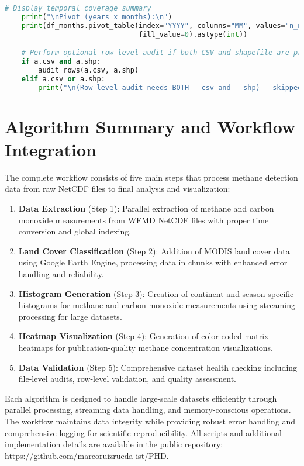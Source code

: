 \begin{lstlisting}[language=Python, caption=Dataset Health Check Algorithm, label=alg:step05_health_check, breaklines=true]
    # Display temporal coverage summary
    print("\nPivot (years x months):\n")
    print(df_months.pivot_table(index="YYYY", columns="MM", values="n_nc",
                                fill_value=0).astype(int))

    # Perform optional row-level audit if both CSV and shapefile are provided
    if a.csv and a.shp:
        audit_rows(a.csv, a.shp)
    elif a.csv or a.shp:
        print("\n(Row-level audit needs BOTH --csv and --shp) - skipped")
\end{lstlisting}

\section{Algorithm Summary and Workflow Integration}
\label{sec:appendixB_summary}

The complete workflow consists of five main steps that process methane detection data from raw NetCDF files to final analysis and visualization:

\begin{enumerate}
	\item \textbf{Data Extraction} (Step 1): Parallel extraction of methane and carbon monoxide measurements from WFMD NetCDF files with proper time conversion and global indexing.

	\item \textbf{Land Cover Classification} (Step 2): Addition of MODIS land cover data using Google Earth Engine, processing data in chunks with enhanced error handling and reliability.

	\item \textbf{Histogram Generation} (Step 3): Creation of continent and season-specific histograms for methane and carbon monoxide measurements using streaming processing for large datasets.

	\item \textbf{Heatmap Visualization} (Step 4): Generation of color-coded matrix heatmaps for publication-quality methane concentration visualizations.

	\item \textbf{Data Validation} (Step 5): Comprehensive dataset health checking including file-level audits, row-level validation, and quality assessment.
\end{enumerate}

Each algorithm is designed to handle large-scale datasets efficiently through parallel processing, streaming data handling, and memory-conscious operations. The workflow maintains data integrity while providing robust error handling and comprehensive logging for scientific reproducibility. All scripts and additional implementation details are available in the public repository: \url{https://github.com/marcoruizrueda-ist/PHD}.
